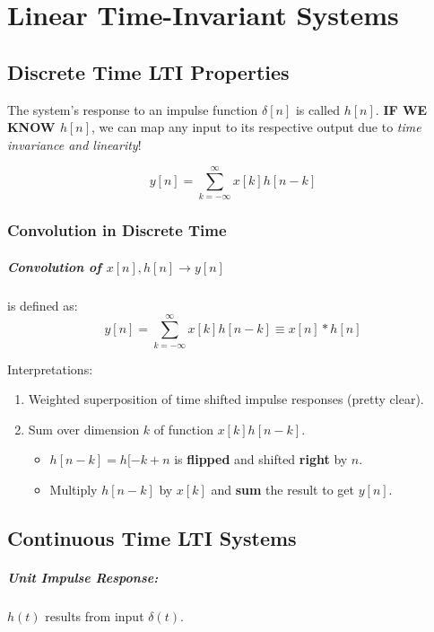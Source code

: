 \documentclass[a4paper,12pt]{report}
\begin{document}
\chapter{Linear Time-Invariant Systems}

\section{Discrete Time LTI Properties}

The system's response to an impulse function $\delta[n]$ is called $h[n]$. \textbf{IF WE KNOW $h[n]$}, we can map any input to its respective output due to \textit{time invariance and linearity}!

\begin{equation}
y[n] = \sum_{k=-\infty}^{\infty} x[k] h[n-k]
\end{equation}

\subsection{Convolution in Discrete Time}

\paragraph{Convolution of $x[n], h[n] \to y[n]$ } is defined as: 
\begin{equation}
y[n] = \sum_{k=-\infty}^{\infty} x[k] h[n-k] \equiv x[n] * h[n]
\end{equation}


Interpretations:
\begin{enumerate}
\item Weighted superposition of time shifted impulse responses (pretty clear).
\item Sum over dimension $k$ of function $x[k]h[n-k]$.
\begin{itemize}
\item $h[n-k] = h[-k+n$ is \textbf{flipped} and shifted \textbf{right} by $n$.
\item Multiply $h[n-k]$ by $x[k]$ and \textbf{sum} the result to get $y[n]$.
\end{itemize}
\end{enumerate}


\section{Continuous Time LTI Systems}

\paragraph{Unit Impulse Response: } $h(t)$ results from input $\delta(t)$. 
\end{document}
